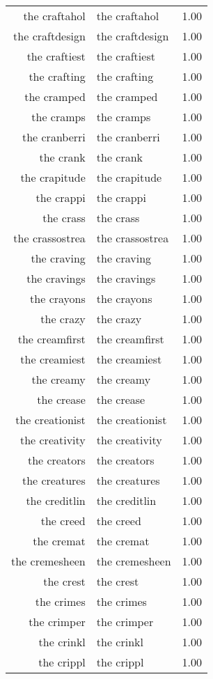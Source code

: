 \begin{table}[ht]
\begin{tabular}{rlr}
  the craftahol & the craftahol & 1.00 \\ 
  the craftdesign & the craftdesign & 1.00 \\ 
  the craftiest & the craftiest & 1.00 \\ 
  the crafting & the crafting & 1.00 \\ 
  the cramped & the cramped & 1.00 \\ 
  the cramps & the cramps & 1.00 \\ 
  the cranberri & the cranberri & 1.00 \\ 
  the crank & the crank & 1.00 \\ 
  the crapitude & the crapitude & 1.00 \\ 
  the crappi & the crappi & 1.00 \\ 
  the crass & the crass & 1.00 \\ 
  the crassostrea & the crassostrea & 1.00 \\ 
  the craving & the craving & 1.00 \\ 
  the cravings & the cravings & 1.00 \\ 
  the crayons & the crayons & 1.00 \\ 
  the crazy & the crazy & 1.00 \\ 
  the creamfirst & the creamfirst & 1.00 \\ 
  the creamiest & the creamiest & 1.00 \\ 
  the creamy & the creamy & 1.00 \\ 
  the crease & the crease & 1.00 \\ 
  the creationist & the creationist & 1.00 \\ 
  the creativity & the creativity & 1.00 \\ 
  the creators & the creators & 1.00 \\ 
  the creatures & the creatures & 1.00 \\ 
  the creditlin & the creditlin & 1.00 \\ 
  the creed & the creed & 1.00 \\ 
  the cremat & the cremat & 1.00 \\ 
  the cremesheen & the cremesheen & 1.00 \\ 
  the crest & the crest & 1.00 \\ 
  the crimes & the crimes & 1.00 \\ 
  the crimper & the crimper & 1.00 \\ 
  the crinkl & the crinkl & 1.00 \\ 
  the crippl & the crippl & 1.00 \\ 

\end{tabular}
\end{table}
